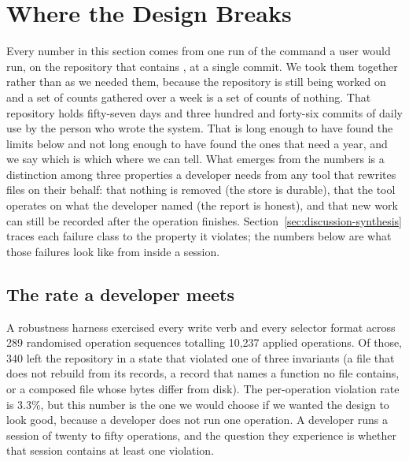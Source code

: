 \section{Where the Design Breaks}
\label{sec:discussion}

Every number in this section comes from one run of the command a user would run,
on the repository that contains \sgt{}, at a single commit. We took them together
rather than as we needed them, because the repository is still being worked on and
a set of counts gathered over a week is a set of counts of nothing. That repository holds
fifty-seven days and three hundred and forty-six commits of daily use by the
person who wrote the system. That is long enough to have found the limits below
and not long enough to have found the ones that need a year, and we say which is
which where we can tell. What emerges from the numbers is a distinction among
three properties a developer needs from any tool that rewrites files on their
behalf: that nothing is removed (the store is durable), that the tool operates on
what the developer named (the report is honest), and that new work can still be
recorded after the operation finishes.
Section~\ref{sec:discussion-synthesis} traces each failure class to the property
it violates; the numbers below are what those failures look like from inside a
session.

\subsection{The rate a developer meets}
\label{sec:session-rate}

A robustness harness exercised every write verb and every selector format across
289 randomised operation sequences totalling 10{,}237 applied operations. Of
those, 340 left the repository in a state that violated one of three invariants
(a file that does not rebuild from its records, a record that names a function no
file contains, or a composed file whose bytes differ from disk). The per-operation
violation rate is 3.3\%, but this number is the one we would choose if we wanted
the design to look good, because a developer does not run one operation. A
developer runs a session of twenty to fifty operations, and the question they
experience is whether that session contains at least one violation.

